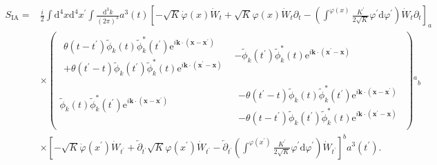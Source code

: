 \documentclass[aps, prd
, preprint
, nofootinbib 
]{revtex4-1}
\newcommand{\dd}{\mathrm{d}}
\newcommand{\ee}{\mathrm{e}}
\newcommand{\dk}{\frac{\dd^3k}{(2\pi)^3}}
\newcommand{\bae}[1]{\begin{align} #1 \end{align}}
\newcommand{\bpme}[1]{\begin{pmatrix} #1 \end{pmatrix}}
\begin{document}
\bae{
	S_\text{IA}=&\frac{i}{2}\int\dd^4x\dd^4x^\prime\int\dk a^3(t)
	\left[-\sqrt{K}\dot{\varphi}(x)\dot{W}_t+\sqrt{K}\varphi(x)\dot{W}_t\partial_t
	-\left(\int^{\varphi(x)}\frac{K^\prime}{2\sqrt{K}}\varphi^\prime\dd\varphi^\prime\right)\dot{W}_t\partial_t\right]_a \nonumber \\
	&\times\bpme{
		\begin{array}{c}
			\theta(t-t^\prime)\tilde{\phi}_k(t)\tilde{\phi}_{k}^*(t^\prime)\ee^{i\mathbf{k}\cdot(\mathbf{x}-\mathbf{x}^\prime)} \\
			+\theta(t^\prime-t)\tilde{\phi}_{k}(t^\prime)\tilde{\phi}_k^{*}(t)\ee^{i\mathbf{k}\cdot(\mathbf{x}^\prime-\mathbf{x})}
		\end{array} &
		-\tilde{\phi}_{k}(t^\prime)\tilde{\phi}_k^{*}(t)\ee^{i\mathbf{k}\cdot(\mathbf{x}^\prime-\mathbf{x})} \\
		\tilde{\phi}_k(t)\tilde{\phi}_{k}^*(t^\prime)\ee^{i\mathbf{k}\cdot(\mathbf{x}-\mathbf{x}^\prime)} &
		\begin{array}{c}
			-\theta(t^\prime-t)\tilde{\phi}_k(t)\tilde{\phi}_{k}^*(t^\prime)\ee^{i\mathbf{k}\cdot(\mathbf{x}-\mathbf{x}^\prime)} \\
			-\theta(t-t^\prime)\tilde{\phi}_{k}(t^\prime)\tilde{\phi}_k^{*}(t)\ee^{i\mathbf{k}\cdot(\mathbf{x}^\prime-\mathbf{x})}
		\end{array}
	}{}^a{}_b \nonumber \\
	&\times\left[-\sqrt{K}\dot{\varphi}(x^\prime)\dot{W}_{t^\prime}+\overleftarrow{\partial}_{t^\prime}\sqrt{K}\varphi(x^\prime)\dot{W}_{t^\prime}
	-\overleftarrow{\partial}_{t^\prime}\left(\int^{\varphi(x^\prime)}\frac{K^\prime}{2\sqrt{K}}\varphi^\prime\dd\varphi^\prime\right)
	\dot{W}_{t^\prime}\right]^ba^3(t^\prime).
}
\end{document}
